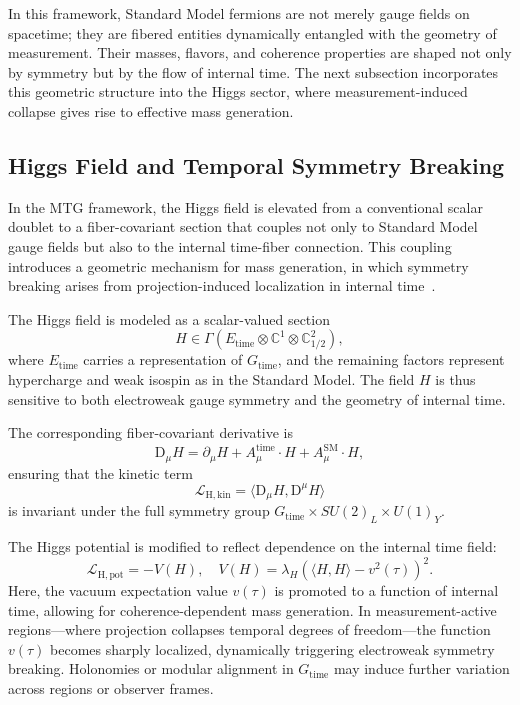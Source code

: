 \documentclass[11pt]{article}
\begin{document}
In this framework, Standard Model fermions are not merely gauge fields on spacetime; they are fibered entities dynamically entangled with the geometry of measurement. Their masses, flavors, and coherence properties are shaped not only by symmetry but by the flow of internal time. The next subsection incorporates this geometric structure into the Higgs sector, where measurement-induced collapse gives rise to effective mass generation.
\subsection{Higgs Field and Temporal Symmetry Breaking}
In the MTG framework, the Higgs field is elevated from a conventional scalar doublet to a fiber-covariant section that couples not only to Standard Model gauge fields but also to the internal time-fiber connection. This coupling introduces a geometric mechanism for mass generation, in which symmetry breaking arises from projection-induced localization in internal time~\cite{giacomini2019quantum, parker2009mass}.

The Higgs field is modeled as a scalar-valued section
\begin{equation}
H \in \Gamma(E_{\mathrm{time}} \otimes \mathbb{C}^1 \otimes \mathbb{C}^2_{1/2}),
\end{equation}
where \( E_{\mathrm{time}} \) carries a representation of \( G_{\mathrm{time}} \), and the remaining factors represent hypercharge and weak isospin as in the Standard Model. The field \( H \) is thus sensitive to both electroweak gauge symmetry and the geometry of internal time.

The corresponding fiber-covariant derivative is
\begin{equation}
\mathrm{D}_\mu H = \partial_\mu H + A_\mu^{\mathrm{time}} \cdot H + A_\mu^{\mathrm{SM}} \cdot H,
\end{equation}
ensuring that the kinetic term
\begin{equation}
\mathcal{L}_{\mathrm{H,kin}} = \langle \mathrm{D}_\mu H, \mathrm{D}^\mu H \rangle
\end{equation}
is invariant under the full symmetry group \( G_{\mathrm{time}} \times SU(2)_L \times U(1)_Y \).

The Higgs potential is modified to reflect dependence on the internal time field:
\begin{equation}
\mathcal{L}_{\mathrm{H,pot}} = - V(H), \quad V(H) = \lambda_H \left( \langle H, H \rangle - v^2(\tau) \right)^2.
\end{equation}
Here, the vacuum expectation value \( v(\tau) \) is promoted to a function of internal time, allowing for coherence-dependent mass generation. In measurement-active regions—where projection collapses temporal degrees of freedom—the function \( v(\tau) \) becomes sharply localized, dynamically triggering electroweak symmetry breaking. Holonomies or modular alignment in \( G_{\mathrm{time}} \) may induce further variation across regions or observer frames.
\end{document}
